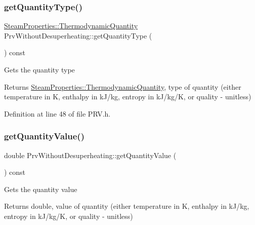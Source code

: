 \subsubsection{\texorpdfstring{get\+Quantity\+Type()}{getQuantityType()}\hspace{0.1cm}{\footnotesize\ttfamily [3/3]}}
{\footnotesize\ttfamily \hyperlink{class_steam_properties_ae0294bedf7d178c2d8fb6aed0f62fbff}{Steam\+Properties\+::\+Thermodynamic\+Quantity} Prv\+Without\+Desuperheating\+::get\+Quantity\+Type (\begin{DoxyParamCaption}{ }\end{DoxyParamCaption}) const\hspace{0.3cm}{\ttfamily [inline]}}

Gets the quantity type

\begin{DoxyReturn}{Returns}
\hyperlink{class_steam_properties_ae0294bedf7d178c2d8fb6aed0f62fbff}{Steam\+Properties\+::\+Thermodynamic\+Quantity}, type of quantity (either temperature in K, enthalpy in k\+J/kg, entropy in k\+J/kg/K, or quality -\/ unitless) 
\end{DoxyReturn}


Definition at line 48 of file P\+R\+V.\+h.

\mbox{\label{class_prv_without_desuperheating_a1113c254f45d08588b0afe4bd1273530}} 
\subsubsection{\texorpdfstring{get\+Quantity\+Value()}{getQuantityValue()}\hspace{0.1cm}{\footnotesize\ttfamily [1/3]}}
{\footnotesize\ttfamily double Prv\+Without\+Desuperheating\+::get\+Quantity\+Value (\begin{DoxyParamCaption}{ }\end{DoxyParamCaption}) const\hspace{0.3cm}{\ttfamily [inline]}}

Gets the quantity value

\begin{DoxyReturn}{Returns}
double, value of quantity (either temperature in K, enthalpy in k\+J/kg, entropy in k\+J/kg/K, or quality -\/ unitless) 
\end{DoxyReturn}


